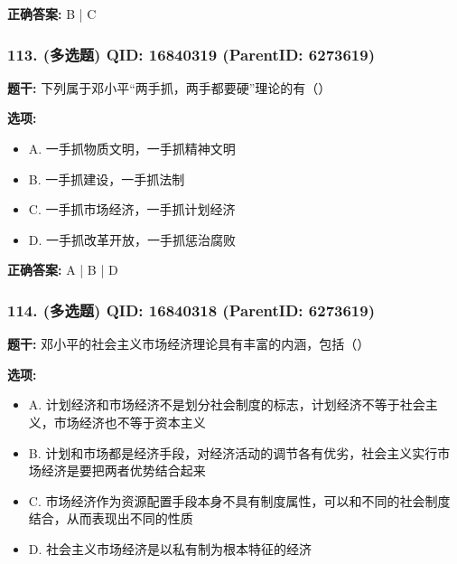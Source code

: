 \documentclass[12pt,UTF8]{ctexart}
\begin{document}
\textbf{正确答案:}
B | C

\vspace{0.3em}\hrulefill\vspace{0.7em}

\subsubsection*{113. (多选题) \small QID: 16840319 (ParentID: 6273619)}

\textbf{题干:}
下列属于邓小平“两手抓，两手都要硬”理论的有（）



\textbf{选项:}
\begin{itemize}[leftmargin=*]

  \item A. 一手抓物质文明，一手抓精神文明

  \item B. 一手抓建设，一手抓法制

  \item C. 一手抓市场经济，一手抓计划经济

  \item D. 一手抓改革开放，一手抓惩治腐败

\end{itemize}

\textbf{正确答案:}
A | B | D

\vspace{0.3em}\hrulefill\vspace{0.7em}

\subsubsection*{114. (多选题) \small QID: 16840318 (ParentID: 6273619)}

\textbf{题干:}
邓小平的社会主义市场经济理论具有丰富的内涵，包括（）



\textbf{选项:}
\begin{itemize}[leftmargin=*]

  \item A. 计划经济和市场经济不是划分社会制度的标志，计划经济不等于社会主义，市场经济也不等于资本主义

  \item B. 计划和市场都是经济手段，对经济活动的调节各有优劣，社会主义实行市场经济是要把两者优势结合起来

  \item C. 市场经济作为资源配置手段本身不具有制度属性，可以和不同的社会制度结合，从而表现出不同的性质

  \item D. 社会主义市场经济是以私有制为根本特征的经济

\end{itemize}
\end{document}
